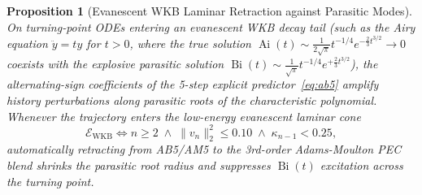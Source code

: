 \documentclass[10pt,twocolumn,letterpaper]{article}
\newtheorem{proposition}[theorem]{Proposition}
\theoremstyle{definition}
\theoremstyle{remark}
\newcommand{\Ai}{\operatorname{Ai}}
\newcommand{\Bi}{\operatorname{Bi}}
\begin{document}
\begin{proposition}[Evanescent WKB Laminar Retraction against Parasitic Modes]
\label{prop:airy_wkb}
On turning-point ODEs entering an evanescent WKB decay tail (such as the Airy equation $\ddot{y} = t y$ for $t > 0$, where the true solution $\Ai(t) \sim \frac{1}{2\sqrt{\pi}}t^{-1/4}e^{-\frac{2}{3}t^{3/2}} \to 0$ coexists with the explosive parasitic solution $\Bi(t) \sim \frac{1}{\sqrt{\pi}}t^{-1/4}e^{+\frac{2}{3}t^{3/2}}$), the alternating-sign coefficients of the 5-step explicit predictor~\eqref{eq:ab5} amplify history perturbations along parasitic roots of the characteristic polynomial. Whenever the trajectory enters the low-energy evanescent laminar cone
\begin{equation}
  \mathcal{E}_{\mathrm{WKB}} \iff n \ge 2 \;\land\; \|v_{n}\|_2^2 \le 0.10 \;\land\; \kappa_{n-1} < 0.25,
  \label{eq:wkb_cone}
\end{equation}
automatically retracting from AB5/AM5 to the 3rd-order Adams-Moulton PEC blend shrinks the parasitic root radius and suppresses $\Bi(t)$ excitation across the turning point.
\end{proposition}
\end{document}
